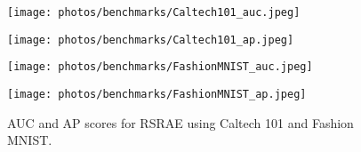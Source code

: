 \documentclass{article} \usepackage{iclr2020_conference,times}
\begin{document}
\begin{figure}[b!]
\centering
\begin{minipage}[t]{0.48\textwidth}
\centering
\texttt{[image: photos/benchmarks/Caltech101\_auc.jpeg]}
\end{minipage}
\begin{minipage}[t]{0.48\textwidth}
\centering
\texttt{[image: photos/benchmarks/Caltech101\_ap.jpeg]}
\end{minipage}
 
\centering
\begin{minipage}[t]{0.48\textwidth}
\centering
\texttt{[image: photos/benchmarks/FashionMNIST\_auc.jpeg]}
 
\end{minipage}
\begin{minipage}[t]{0.48\textwidth}
\centering
\texttt{[image: photos/benchmarks/FashionMNIST\_ap.jpeg]}
 
\end{minipage}

\caption{AUC and AP scores for RSRAE using Caltech 101 and Fashion MNIST.}
\label{fig:aucapall}

\end{figure}
\end{document}
